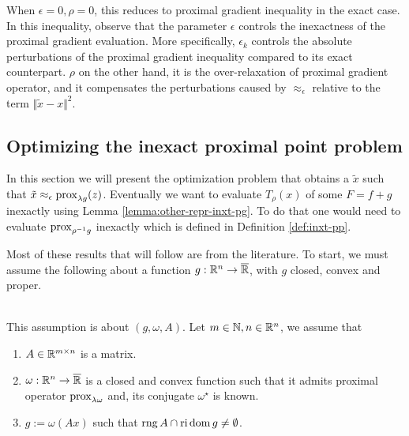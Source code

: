 \documentclass[12pt]{article}
\DeclareMathOperator{\rng}{\mathop{rng}}
\begin{document}
        \begin{remark}
            When $\epsilon = 0, \rho = 0$, this reduces to proximal gradient inequality in the exact case. 
            In this inequality, observe that the parameter $\epsilon$ controls the inexactness of the proximal gradient evaluation. 
            More specifically, $\epsilon_k$ controls the absolute perturbations of the proximal gradient inequality compared to its exact counterpart. 
            $\rho$ on the other hand, it is the over-relaxation of proximal gradient operator, and it compensates the perturbations caused by $\approx_\epsilon$ relative to the term $\Vert \tilde x - x\Vert^2$. 
        \end{remark}
    \subsection{Optimizing the inexact proximal point problem}\label{sec:optz-inxt-pp-problem}
        In this section we will present the optimization problem that obtains a $\tilde x$ such that $\tilde x \approx_\epsilon \operatorname{prox}_{\lambda g}(z)$. 
        Eventually we want to evaluate $T_{\rho}(x)$ of some $F = f + g$ inexactly using Lemma \ref{lemma:other-repr-inxt-pg}. 
        To do that one would need to evaluate $\operatorname{prox}_{\rho^{-1}g}$ inexactly which is defined in Definition \ref{def:inxt-pp}. 
        \par
        Most of these results that will follow are from the literature. 
        To start, we must assume the following about a function $g: \mathbb R^n \rightarrow \overline {\mathbb R}$, with $g$ closed, convex and proper. 
        \begin{assumption}\;\label{ass:for-inxt-prox}\\
            This assumption is about $(g, \omega, A)$. 
            Let $m \in \mathbb N, n \in \mathbb R^n$, we assume that 
            \begin{enumerate}[nosep]
                \item $A\in \mathbb R^{m \times n}$ is a matrix. 
                \item $\omega: \mathbb R^n \rightarrow \overline {\mathbb R}$ is a closed and convex function such that it admits proximal operator $\operatorname{prox}_{\lambda\omega}$ and, its conjugate $\omega^\star$ is known. 
                \item $g := \omega(Ax)$ such that $\rng A \cap \reli\dom g \neq\emptyset$. 
            \end{enumerate}
        \end{assumption}
\end{document}
